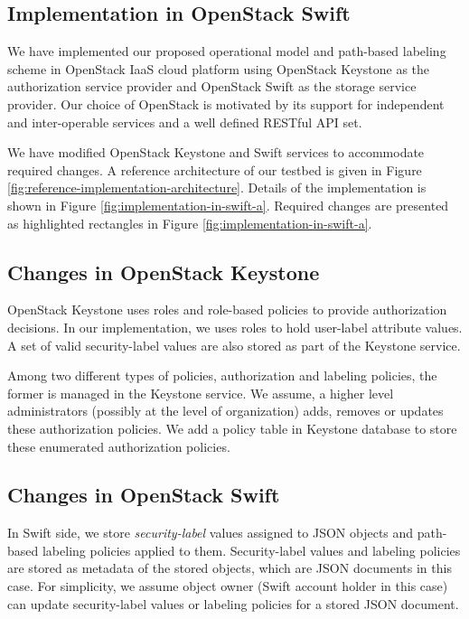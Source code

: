 


\subsection { Implementation in OpenStack Swift}
\label{sec:implementation}





We have implemented our proposed operational model and path-based labeling scheme in OpenStack IaaS cloud platform using OpenStack Keystone as the authorization service provider and OpenStack Swift as the storage service provider. Our choice of OpenStack is motivated by its support for independent and inter-operable  services and a well defined RESTful API set.

We have modified OpenStack Keystone and Swift services to accommodate required changes. A reference architecture of our testbed is given in Figure \ref{fig:reference-implementation-architecture}. Details of the implementation is shown in Figure \ref{fig:implementation-in-swift-a}. Required changes are presented as highlighted rectangles in Figure \ref{fig:implementation-in-swift-a}.

\subsection{Changes in OpenStack Keystone}

 OpenStack Keystone uses roles and role-based policies to provide authorization decisions. In our implementation, we uses roles to hold user-label attribute values. A set of valid security-label values are also stored as part of the Keystone service.
 
 Among two different types of policies, authorization and labeling policies, the former is managed in the Keystone service. We assume, a higher level administrators (possibly at the level of organization) adds, removes or updates these authorization policies. We add a policy table in Keystone database to store these enumerated authorization policies. 

\subsection{Changes in OpenStack Swift}

In Swift side, we store \textit{security-label} values assigned to JSON objects and path-based labeling policies applied to them.  Security-label values and labeling policies are stored as metadata of the stored objects, which are JSON documents in this case. For simplicity, we assume object owner (Swift account holder in this case) can update security-label values or labeling policies for a stored JSON document. 


